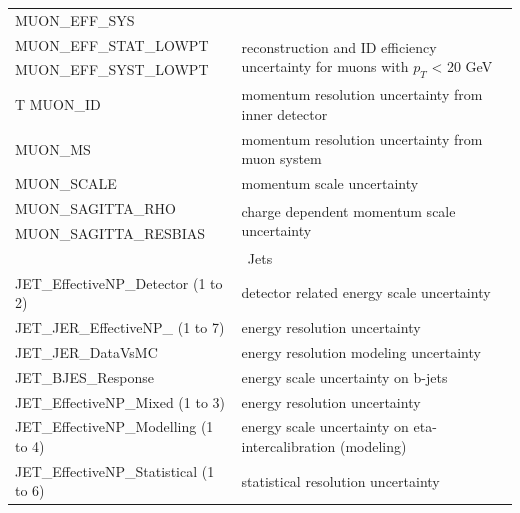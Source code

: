 \begin{table}
{\begin{tabular}{l|l}
  MUON\_EFF\_SYS                 &                                                                      \\
  MUON\_EFF\_STAT\_LOWPT         & \multirow{2}{*}{reconstruction and ID efficiency uncertainty for muons with $p_T$ < 20 GeV} \\
  MUON\_EFF\_SYST\_LOWPT         &                                                                      \\
T%
  MUON\_ID                       & momentum resolution uncertainty from inner detector                  \\
  MUON\_MS                       & momentum resolution uncertainty from muon system                     \\
  MUON\_SCALE                    & momentum scale uncertainty                                           \\
  MUON\_SAGITTA\_RHO             & \multirow{2}{*}{charge dependent momentum scale uncertainty}         \\
  MUON\_SAGITTA\_RESBIAS         &                                                                      \\
  \hline
  \multicolumn{2}{c}{Jets}\\
  \hline         
  JET\_EffectiveNP\_Detector (1 to 2) & detector related energy scale uncertainty \\
  JET\_JER\_EffectiveNP\_ (1 to 7) & energy resolution uncertainty  \\
  JET\_JER\_DataVsMC 	& energy resolution modeling uncertainty \\
  JET\_BJES\_Response & energy scale uncertainty on b-jets \\
  JET\_EffectiveNP\_Mixed (1 to 3) & energy resolution uncertainty \\
  JET\_EffectiveNP\_Modelling (1 to 4) &  energy scale uncertainty on eta-intercalibration (modeling) \\
  JET\_EffectiveNP\_Statistical (1 to 6) &  statistical resolution uncertainty \\

\end{tabular}}
\end{table}
